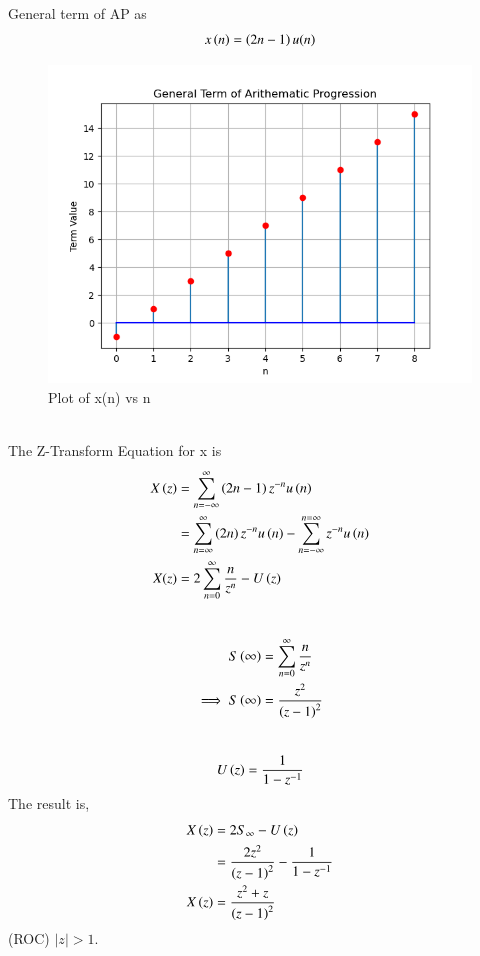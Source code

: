 \documentclass[journal,12pt,twocolumn]{IEEEtran}
\theoremstyle{remark}
\begin{document}
General term of AP as 
\begin{align}
    x\left(n\right)=\left(2n-1\right)u(n)
\end{align}
\begin{figure}[!h]
    \centering
    \includegraphics[width=1.0\linewidth]{test.png}
    \caption{Plot of x(n) vs n}
    \label{fig:1}
\end{figure}\\
The Z-Transform Equation for x is\\
\begin{align}
    X\left(z\right)&=\sum_{n=-\infty}^{\infty}\left(2n-1\right)z^{-n}u\left(n\right) \\ &=\sum_{n=\infty}^{\infty}\left(2n\right)z^{-n}u\left(n\right) -\sum_{n=-\infty}^{n=\infty}z^{-n}u\left(n\right)\\
    X(z)&=2\sum_{n=0}^{\infty}\dfrac{n}{z^{n}}-U\left(z\right)
\end{align}
\\
\begin{align}
   S\left(\infty\right)&=\sum_{n=0}^{\infty}\dfrac{n}{z^{n}}\\
   \implies S\left(\infty\right)&=\dfrac{z^2}{\left(z-1\right)^{2}}
\end{align}
\\
\begin{align}
   U\left(z\right)=\dfrac{1}{1-z^{-1}}
\end{align}
The result is,
\begin{align}
    X\left(z\right)&=2S_\infty-U\left(z\right)\\
    &=\dfrac{2z^2}{\left(z-1\right)^{2}}-\dfrac{1}{1-z^{-1}}\\
    X\left(z\right)&=\dfrac{z^2+z}{\left(z-1\right)^{2}}
\end{align}
(ROC) \(|z| > 1\).\\
\end{document}
